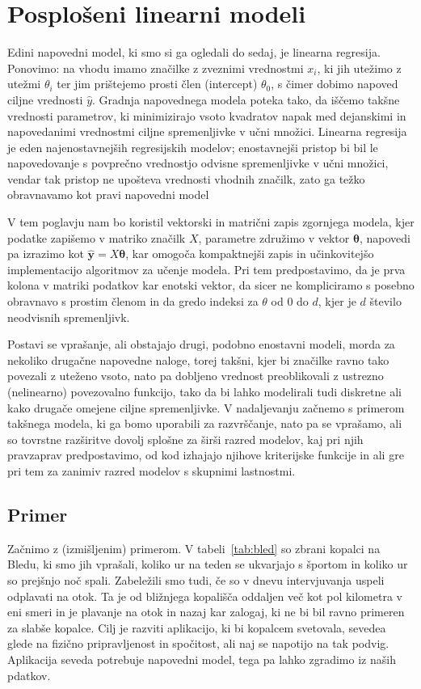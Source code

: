 \chapter{Posplošeni linearni modeli}

Edini napovedni model, ki smo si ga ogledali do sedaj, je linearna regresija. Ponovimo: na vhodu imamo značilke z zveznimi vrednostmi $x_i$, ki jih utežimo z utežmi $\theta_i$ ter jim prištejemo prosti člen (intercept) $\theta_0$, s čimer dobimo napoved ciljne vrednosti $\hat{y}$. Gradnja napovednega modela poteka tako, da iščemo takšne vrednosti parametrov, ki minimizirajo vsoto kvadratov napak med dejanskimi in napovedanimi vrednostmi ciljne spremenljivke v učni množici. Linearna regresija je eden najenostavnejših regresijskih modelov; enostavnejši pristop bi bil le napovedovanje s povprečno vrednostjo odvisne spremenljivke v učni množici, vendar tak pristop ne upošteva vrednosti vhodnih značilk, zato ga težko obravnavamo kot pravi napovedni model

V tem poglavju nam bo koristil vektorski in matrični zapis zgornjega modela, kjer podatke zapišemo v matriko značilk $X$, parametre združimo v vektor $\boldsymbol{\theta}$, napovedi pa izrazimo kot $\hat{\mathbf{y}} = X \boldsymbol{\theta}$, kar omogoča kompaktnejši zapis in učinkovitejšo implementacijo algoritmov za učenje modela. Pri tem predpostavimo, da je prva kolona v matriki podatkov kar enotski vektor, da sicer ne kompliciramo s posebno obravnavo s prostim členom in da gredo indeksi za $\theta$ od $0$ do $d$, kjer je $d$ število neodvisnih spremenljivk.

Postavi se vprašanje, ali obstajajo drugi, podobno enostavni modeli, morda za nekoliko drugačne napovedne naloge, torej takšni, kjer bi značilke ravno tako povezali z uteženo vsoto, nato pa dobljeno vrednost preoblikovali z ustrezno (nelinearno) povezovalno funkcijo, tako da bi lahko modelirali tudi diskretne ali kako drugače omejene ciljne spremenljivke. V nadaljevanju začnemo s primerom takšnega modela, ki ga bomo uporabili za razvrščanje, nato pa se vprašamo, ali so tovrstne razširitve dovolj splošne za širši razred modelov, kaj pri njih pravzaprav predpostavimo, od kod izhajajo njihove kriterijske funkcije in ali gre pri tem za zanimiv razred modelov s skupnimi lastnostmi.

\section{Primer}

Začnimo z (izmišljenim) primerom. V tabeli~\ref{tab:bled} so zbrani kopalci na Bledu, ki smo jih vprašali, koliko ur na teden se ukvarjajo s športom in koliko ur so prejšnjo noč spali. Zabeležili smo tudi, če so v dnevu intervjuvanja uspeli odplavati na otok. Ta je od bližnjega kopališča oddaljen več kot pol kilometra v eni smeri in je plavanje na otok in nazaj kar zalogaj, ki ne bi bil ravno primeren za slabše kopalce. Cilj je razviti aplikacijo, ki bi kopalcem svetovala, sevedea glede na fizično pripravljenost in spočitost, ali naj se napotijo na tak podvig. Aplikacija seveda potrebuje napovedni model, tega pa lahko zgradimo iz naših pdatkov.

